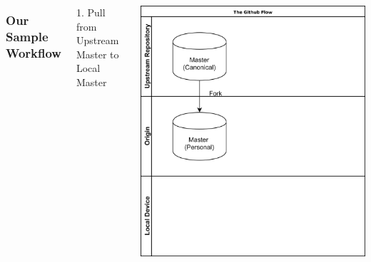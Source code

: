 \documentclass[unknownkeysallowed]{beamer}
\begin{document}
\begin{frame}
    \vspace{1cm}
	\begin{columns}
		\column{2.5in}
    \frametitle{Our Sample Workflow}
        1. Pull from Upstream Master to \\
        Local Master \linebreak\linebreak
	\linebreak\linebreak 
	\linebreak\linebreak
	\linebreak\linebreak
	\linebreak\linebreak
	\linebreak\linebreak
	\column{2.25in}
	\begin{center}
	\includegraphics[width = .9\linewidth]{assets/gitflow2}
	\end{center}
	\end{columns}
    \vspace{1cm}
\end{frame}
\end{document}
